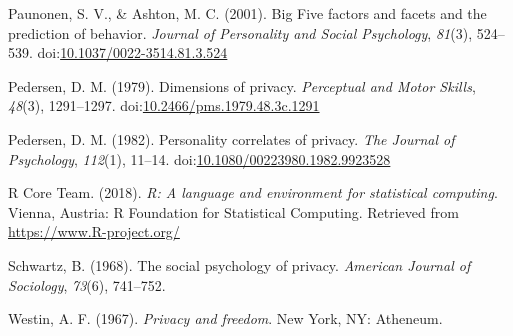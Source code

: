 \documentclass[man]{apa6}
\theoremstyle{definition}
\theoremstyle{definition}
\theoremstyle{definition}
\theoremstyle{remark}
\begin{document}
\leavevmode\hypertarget{ref-Paunonen.2001}{}%
Paunonen, S. V., \& Ashton, M. C. (2001). Big Five factors and facets
and the prediction of behavior. \emph{Journal of Personality and Social
Psychology}, \emph{81}(3), 524--539.
doi:\href{https://doi.org/10.1037/0022-3514.81.3.524}{10.1037/0022-3514.81.3.524}

\leavevmode\hypertarget{ref-Pedersen.1979}{}%
Pedersen, D. M. (1979). Dimensions of privacy. \emph{Perceptual and
Motor Skills}, \emph{48}(3), 1291--1297.
doi:\href{https://doi.org/10.2466/pms.1979.48.3c.1291}{10.2466/pms.1979.48.3c.1291}

\leavevmode\hypertarget{ref-Pedersen.1982}{}%
Pedersen, D. M. (1982). Personality correlates of privacy. \emph{The
Journal of Psychology}, \emph{112}(1), 11--14.
doi:\href{https://doi.org/10.1080/00223980.1982.9923528}{10.1080/00223980.1982.9923528}

\leavevmode\hypertarget{ref-R-base}{}%
R Core Team. (2018). \emph{R: A language and environment for statistical
computing}. Vienna, Austria: R Foundation for Statistical Computing.
Retrieved from \url{https://www.R-project.org/}

\leavevmode\hypertarget{ref-Schwartz.1968}{}%
Schwartz, B. (1968). The social psychology of privacy. \emph{American
Journal of Sociology}, \emph{73}(6), 741--752.

\leavevmode\hypertarget{ref-Westin.1967}{}%
Westin, A. F. (1967). \emph{Privacy and freedom}. New York, NY:
Atheneum.

\endgroup
\end{document}
